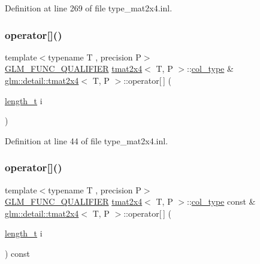 Definition at line 269 of file type\+\_\+mat2x4.\+inl.

\mbox{\label{structglm_1_1detail_1_1tmat2x4_a6227fe9230c96905cd82b40fbbba833b}} 
\subsubsection{\texorpdfstring{operator[]()}{operator[]()}\hspace{0.1cm}{\footnotesize\ttfamily [1/2]}}
{\footnotesize\ttfamily template$<$typename T , precision P$>$ \\
\hyperlink{setup_8hpp_a33fdea6f91c5f834105f7415e2a64407}{G\+L\+M\+\_\+\+F\+U\+N\+C\+\_\+\+Q\+U\+A\+L\+I\+F\+I\+ER} \hyperlink{structglm_1_1detail_1_1tmat2x4}{tmat2x4}$<$ T, P $>$\+::\hyperlink{structglm_1_1detail_1_1tmat2x4_a7324a2efc8a0f59f538568015bdda76b}{col\+\_\+type} \& \hyperlink{structglm_1_1detail_1_1tmat2x4}{glm\+::detail\+::tmat2x4}$<$ T, P $>$\+::operator\mbox{[}$\,$\mbox{]} (\begin{DoxyParamCaption}\item[{\hyperlink{namespaceglm_a090a0de2260835bee80e71a702492ed9}{length\+\_\+t}}]{i }\end{DoxyParamCaption})}



Definition at line 44 of file type\+\_\+mat2x4.\+inl.

\mbox{\label{structglm_1_1detail_1_1tmat2x4_a947815fa214797973eab5cd76e5b3534}} 
\subsubsection{\texorpdfstring{operator[]()}{operator[]()}\hspace{0.1cm}{\footnotesize\ttfamily [2/2]}}
{\footnotesize\ttfamily template$<$typename T , precision P$>$ \\
\hyperlink{setup_8hpp_a33fdea6f91c5f834105f7415e2a64407}{G\+L\+M\+\_\+\+F\+U\+N\+C\+\_\+\+Q\+U\+A\+L\+I\+F\+I\+ER} \hyperlink{structglm_1_1detail_1_1tmat2x4}{tmat2x4}$<$ T, P $>$\+::\hyperlink{structglm_1_1detail_1_1tmat2x4_a7324a2efc8a0f59f538568015bdda76b}{col\+\_\+type} const  \& \hyperlink{structglm_1_1detail_1_1tmat2x4}{glm\+::detail\+::tmat2x4}$<$ T, P $>$\+::operator\mbox{[}$\,$\mbox{]} (\begin{DoxyParamCaption}\item[{\hyperlink{namespaceglm_a090a0de2260835bee80e71a702492ed9}{length\+\_\+t}}]{i }\end{DoxyParamCaption}) const}



